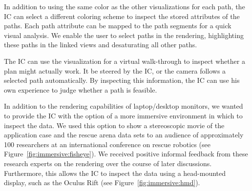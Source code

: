 \documentclass{egpubl}
\begin{document}
 In addition to using the same color as the other visualizations for each path, the IC can select a different coloring scheme to inspect the stored attributes of the paths. Each path attribute can be mapped to the path segments for a quick visual analysis. We enable the user to select paths in the rendering, highlighting these paths in the linked views and desaturating all other paths.

The IC can use the visualization for a virtual walk-through to inspect whether a plan might actually work. It be steered by the IC, or the camera follows a selected path automatically. By inspecting this information, the IC can use his own experience to judge whether a path is feasible.

 In addition to the rendering capabilities of laptop/desktop monitors, we wanted to provide the IC with the option of a more immersive environment in which to inspect the data. We used this option to show a stereoscopic movie of the application case and the rescue arena data sets to an audience of approximately 100 researchers at an international conference on rescue robotics (see Figure~\ref{fig:immersive:fisheye}). We received positive informal feedback from these research experts on the rendering over the course of later discussions. Furthermore, this allows the IC to inspect the data using a head-mounted display, such as the Oculus Rift (see Figure~\ref{fig:immersive:hmd}). 
\end{document}
